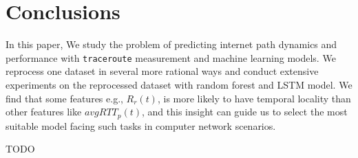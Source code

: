 \documentclass[sigconf]{acmart}
\begin{document}
	\section{Conclusions}
	In this paper, We study the problem of predicting internet path dynamics and performance with \texttt{traceroute} measurement and machine learning models. We reprocess one dataset in several more rational ways and conduct extensive experiments on the reprocessed dataset with random forest and LSTM model. We find that some features e.g., $R_r(t)$, is more likely to have temporal locality than other features like $avgRTT_p(t)$, and this insight can guide us to select the most suitable model facing such tasks in computer network scenarios.

	\begin{acks}
		TODO
	\end{acks}
	
	
	 	
	
	
	
\end{document}
